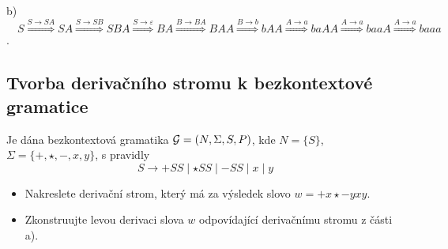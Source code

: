     \vspace*{2mm}
    b) 
    $\quad S \stackrel{S \rightarrow SA}{\Longrightarrow} SA \stackrel{S \rightarrow SB}{\Longrightarrow} SBA 
    \stackrel{S \rightarrow \varepsilon}{\Longrightarrow} BA \stackrel{B \rightarrow BA}{\Longrightarrow} BAA 
    \stackrel{B \rightarrow b}{\Longrightarrow} bAA \stackrel{A \rightarrow a}{\Longrightarrow} baAA 
    \stackrel{A \rightarrow a}{\Longrightarrow} baaA\stackrel{A \rightarrow a}{\Longrightarrow} baaa$.

\subsection{Tvorba derivačního stromu k bezkontextové gramatice} %
Je dána bezkontextová gramatika $\mathcal{G} = (N, \Sigma, S, P)$, kde $N = \{S\}$, $\Sigma = \{+, \star, -, x, y\}$, 
s pravidly 
$$S \rightarrow +SS \mid \star SS \mid -SS \mid x \mid y $$ 

\begin{itemize}[noitemsep]
    \item Nakreslete derivační strom, který má za výsledek slovo $ w = + x \star - y x y$.  
    \item Zkonstruujte levou derivaci slova $w$ odpovídající derivačnímu stromu z části a).
\end{itemize}
 

